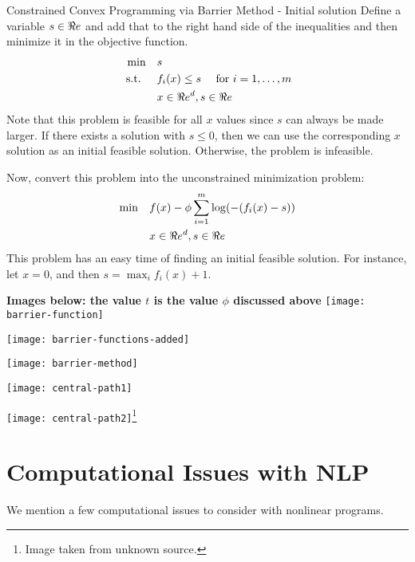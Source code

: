 \begin{general}{Constrained Convex Programming via Barrier Method - Initial solution}{}
Define a variable $s \in \Re e$ and add that to the right hand side of the inequalities and then minimize it in the objective function.
\begin{equation}
\label{eq:convex-programming}
\begin{split}
\min \quad & s\\
\mbox{ s.t. }  \quad & f_i(x) \leq s \quad  \mbox{ for } i=1, \dots, m\\
& x \in \Re e^d, s \in \Re e
\end{split}
\end{equation}
Note that this problem is feasible for all $x$ values since $s$ can always be made larger.  
If there exists a solution with $s \leq 0$, then we can use the corresponding $x$ solution as an initial feasible solution.  Otherwise, the problem is infeasible.

Now, convert this problem into the unconstrained minimization problem:
\begin{equation}
\label{eq:convex-programming}
\begin{split}
\min \quad & f(x) - \phi \sum_{i=1}^m \log(-(f_i(x)-s)) \\
& x \in \Re e^d, s \in \Re e
\end{split}
\end{equation}
This problem has an easy time of finding an initial feasible solution.  For instance, let $x = 0$, and then $s = \max_i f_i(x) +1 $.  
\end{general}


\textbf{Images below: the value $t$ is the value $\phi$ discussed above}
\texttt{[image: barrier-function]}

\texttt{[image: barrier-functions-added]}

\texttt{[image: barrier-method]}

\texttt{[image: central-path1]}

\texttt{[image: central-path2]}\footnote{Image taken from unknown source.}


\chapter{Computational Issues with NLP}
We mention a few computational issues to consider with nonlinear programs.  
